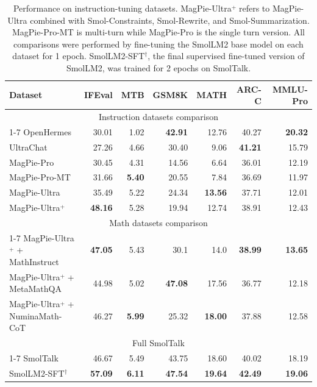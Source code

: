 \documentclass{article}
\theoremstyle{plain}
\theoremstyle{definition}
\theoremstyle{remark}
\begin{document}
\begin{table}[h]
\caption{Performance on instruction-tuning datasets. MagPie-Ultra$\overset{+}{}$ refers to MagPie-Ultra combined with Smol-Constraints, Smol-Rewrite, and Smol-Summarization. MagPie-Pro-MT is multi-turn while MagPie-Pro is the single turn version. 
All comparisons were performed by fine-tuning the SmolLM2 base model on each dataset for 1 epoch. SmolLM2-SFT$^\dagger$, the final supervised fine-tuned version of SmolLM2, was trained for 2 epochs on SmolTalk.
}
\label{tab:instruction-tuning-ablations}
\centering
\begin{tabular}{l r r r r r r}
\toprule
\textbf{Dataset} & \textbf{IFEval} & \textbf{MTB} 
                 & \textbf{GSM8K}  & \textbf{MATH} & \textbf{ARC-C} & \textbf{MMLU-Pro} \\
\midrule
\multicolumn{7}{c}{Instruction datasets comparison}\\
\cmidrule{1-7}
OpenHermes                    & 30.01 & 1.02 & \textbf{42.91}  & 12.76 & 40.27 & \textbf{20.32} \\
UltraChat                     & 27.26 & 4.66 & 30.40 & 9.06 & \textbf{41.21} & 15.79 \\
MagPie-Pro                    & 30.45 & 4.31 & 14.56 & 6.64 & 36.01 & 12.19  \\
MagPie-Pro-MT                    & 31.66 & \textbf{5.40} & 20.55 & 7.84 & 36.69 & 11.97 \\
MagPie-Ultra                & 35.49 & 5.22 & 24.34 & \textbf{13.56} & 37.71 & 12.01  \\
MagPie-Ultra$\overset{+}{}$                & \textbf{48.16} & 5.28 & 19.94 & 12.74 & 38.91 & 12.43 \\
\midrule  
\multicolumn{7}{c}{Math datasets comparison} \\
\cmidrule{1-7}
MagPie-Ultra$\overset{+}{}$ 
 + MathInstruct               & \textbf{47.05} & 5.43 & 30.1 & 14.0 & \textbf{38.99} & \textbf{13.65}  \\
MagPie-Ultra$\overset{+}{}$ 
 + MetaMathQA                  & 44.98 & 5.02 & \textbf{47.08} & 17.56 & 36.77 & 12.18 \\
MagPie-Ultra$\overset{+}{}$ 
 + NuminaMath-CoT                  & 46.27 & \textbf{5.99} & 25.32 & \textbf{18.00} & 37.88 & 12.58 \\
\midrule
\multicolumn{7}{c}{Full SmolTalk}\\
\cmidrule{1-7}
SmolTalk  & 46.67 & 5.49 & 43.75 & 18.60 & 40.02 & 18.19 \\
SmolLM2-SFT$^\dagger$  & \textbf{57.09} & \textbf{6.11} & \textbf{47.54} & \textbf{19.64} & \textbf{42.49} & \textbf{19.06} \\
\bottomrule
\end{tabular}
\end{table}
\end{document}
